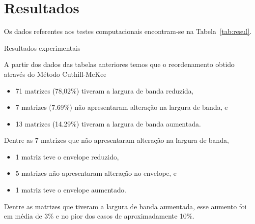 \section{Resultados}
Os dados referentes aos testes computacionais encontram-se na
Tabela~\ref{tab:resul}.
\begin{table}
    \centering
    \caption{Resultados experimentais}
    \label{tab:resul}
\end{table}
\begin{table}
    \centering
\end{table}

A partir dos dados das tabelas anteriores temos que o reordenamento obtido
através do Método Cuthill-McKee 
\begin{itemize}
    \item 71 matrizes (78,02\%) tiveram a largura de banda reduzida,
    \item 7 matrizes (7.69\%) não apresentaram alteração na largura de banda, e
    \item 13 matrizes (14.29\%) tiveram a largura de banda aumentada.
\end{itemize}

Dentre as 7 matrizes que não apresentaram alteração na largura de banda,
\begin{itemize}
    \item 1 matriz teve o envelope reduzido,
    \item 5 matrizes não apresentaram alteração no envelope, e
    \item 1 matriz teve o envelope aumentado.
\end{itemize}

Dentre as matrizes que tiveram a largura de banda aumentada, esse aumento foi
em média de 3\% e no pior dos casos de aproximadamente 10\%.
